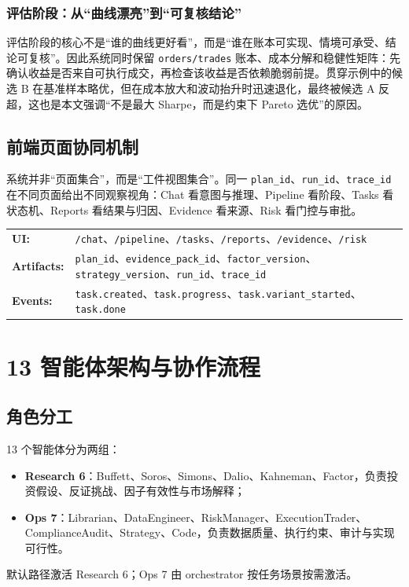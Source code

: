 \documentclass{article}
\newcommand{\tok}[1]{\nolinkurl{#1}}
\begin{document}
\subsubsection{评估阶段：从“曲线漂亮”到“可复核结论”}
评估阶段的核心不是“谁的曲线更好看”，而是“谁在账本可实现、情境可承受、结论可复核”。因此系统同时保留 \tok{orders/trades} 账本、成本分解和稳健性矩阵：先确认收益是否来自可执行成交，再检查该收益是否依赖脆弱前提。贯穿示例中的候选 B 在基准样本略优，但在成本放大和波动抬升时迅速退化，最终被候选 A 反超，这也是本文强调“不是最大 Sharpe，而是约束下 Pareto 选优”的原因。

\subsection{前端页面协同机制}
系统并非“页面集合”，而是“工件视图集合”。同一 \tok{plan_id}、\tok{run_id}、\tok{trace_id} 在不同页面给出不同观察视角：Chat 看意图与推理、Pipeline 看阶段、Tasks 看状态机、Reports 看结果与归因、Evidence 看来源、Risk 看门控与审批。

\begin{verifybox}
\footnotesize
\begin{tabularx}{\linewidth}{@{}>{\bfseries}p{1.9cm}X@{}}
UI: & \tok{/chat}、\tok{/pipeline}、\tok{/tasks}、\tok{/reports}、\tok{/evidence}、\tok{/risk} \\
Artifacts: & \tok{plan_id}、\tok{evidence_pack_id}、\tok{factor_version}、\tok{strategy_version}、\tok{run_id}、\tok{trace_id} \\
Events: & \tok{task.created}、\tok{task.progress}、\tok{task.variant_started}、\tok{task.done} \\
\end{tabularx}
\end{verifybox}

\section{13 智能体架构与协作流程}
\subsection{角色分工}
13 个智能体分为两组：
\begin{itemize}
  \item \textbf{Research 6}：Buffett、Soros、Simons、Dalio、Kahneman、Factor，负责投资假设、反证挑战、因子有效性与市场解释；
  \item \textbf{Ops 7}：Librarian、DataEngineer、RiskManager、ExecutionTrader、ComplianceAudit、Strategy、Code，负责数据质量、执行约束、审计与实现可行性。
\end{itemize}
默认路径激活 Research 6；Ops 7 由 orchestrator 按任务场景按需激活。
\end{document}
